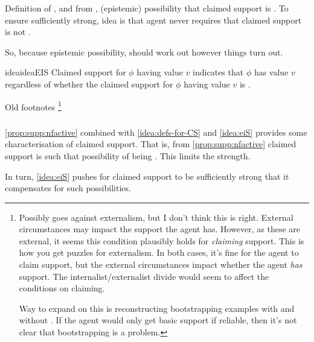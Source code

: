 \begin{note}[\eiS{}]
  Definition of \mom{}, and from \nfcs{}, (epistemic) possibility that claimed support is \mom{}.
  To ensure sufficiently strong, idea is that agent never requires that claimed support is not \mom{}.

  So, because epistemic possibility, should work out however things turn out.



  \begin{restatable}[\eiS{-}]{idea}{ideaEIS}\label{idea:eiS}
    Claimed support for \(\phi\) having value \(v\) indicates that \(\phi\) has value \(v\) regardless of whether the claimed support for \(\phi\) having value \(v\) is \mom{}.
  \end{restatable}
  {
    \color{red}
    Old footnotes\nolinebreak
    \footnote{
      Possibly goes against externalism, but I don't think this is right.
      External circumstances may impact the support the agent has.
      However, as these are external, it seems this condition plausibly holds for \emph{claiming} support.
      This is how you get puzzles for externalism.
      In both cases, it's fine for the agent to claim support, but the external circumstances impact whether the agent \emph{has} support.
      The internalist/externalist divide would seem to affect the conditions on claiming.

      Way to expand on this is reconstructing bootstrapping examples with and without \eiS{}.
      If the agent would only get basic support if reliable, then it's not clear that bootstrapping is a problem.
    }
  }
\end{note}

\subsubsection{}
\label{sec:claim-supp-requ}

\begin{note}
  \autoref{prop:supp:nfactive} combined with \autoref{idea:defs-for-CS} and \autoref{idea:eiS} provides some characterisation of claimed support.
  That is, from \autoref{prop:supp:nfactive} claimed support is such that possibility of being \mom{}.
  This limits the strength.

  In turn, \autoref{idea:eiS} pushes for claimed support to be sufficiently strong that it compensates for such possibilities.
\end{note}

